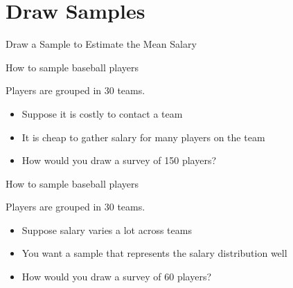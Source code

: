 \documentclass{beamer}
\newcommand\bref[2]{\href{#1}{\color{blue}{#2}}}
\begin{document}
\section{Draw Samples}

\begin{frame}{Draw a Sample to Estimate the Mean Salary}
\end{frame}

\begin{frame}{How to sample baseball players}

Players are grouped in 30 teams.
\begin{itemize}
\item Suppose it is costly to contact a team
\item It is cheap to gather salary for many players on the team
\item How would you draw a survey of 150 players?
\end{itemize}

\end{frame}

\begin{frame}{How to sample baseball players}

Players are grouped in 30 teams.
\begin{itemize}
\item Suppose salary varies a lot across teams
\item You want a sample that represents the salary distribution well
\item How would you draw a survey of 60 players?
\end{itemize}

\end{frame}
\end{document}
